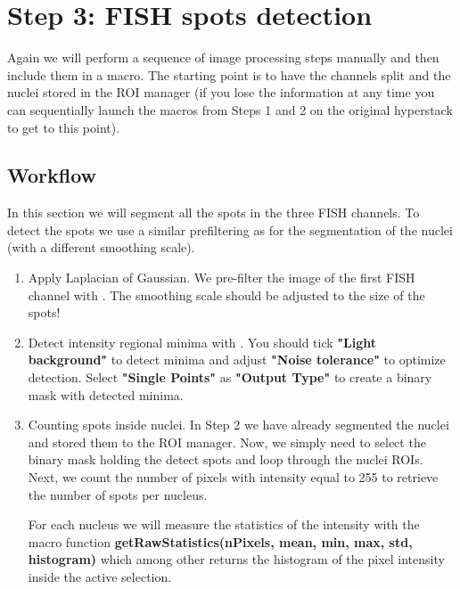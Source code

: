 \section{Step 3: FISH spots detection}

Again we will perform a sequence of image processing steps manually and then include them in a macro. The starting point is to have the channels split and the nuclei stored in the ROI manager (if you lose the information at any time you can sequentially launch the macros from Steps 1 and 2 on the original hyperstack to get to this point).

\subsection{Workflow}
In this section we will segment all the spots in the three FISH channels. To detect the spots we use a similar prefiltering as for the segmentation of the nuclei (with a different smoothing scale).

\begin{enumerate}
    \item Apply Laplacian of Gaussian. We pre-filter the image of the first FISH channel with . The smoothing scale should be adjusted to the size of the spots!
    
\item Detect intensity regional minima with . You should tick \textbf{"Light background"} to detect minima and adjust \textbf{"Noise tolerance"} to optimize detection. Select \textbf{"Single Points"} as \textbf{"Output Type"} to create a binary mask with detected minima.
    
    \item Counting spots inside nuclei.
    In Step 2 we have already segmented the nuclei and stored them to the ROI manager. Now, we simply need to select the binary mask holding the detect spots and loop through the nuclei ROIs. Next, we count the number of pixels with intensity equal to 255 to retrieve the number of spots per nucleus.
    
    For each nucleus we will measure the statistics of the intensity with the macro function \textbf{getRawStatistics(nPixels, mean, min, max, std, histogram)} which among other returns the histogram of the pixel intensity inside the active selection.

\end{enumerate}